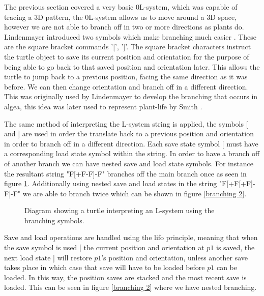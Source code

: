 \begin{flushleft}

The previous section covered a very basic 0L-system, which was capable of tracing a 3D pattern, the 0L-system allows us to move around a 3D space, however we are not able to branch off in two or more directions as plants do. Lindenmayer introduced two symbols which make branching much easier \cite{lindenmayer1968mathematical}. These are the square bracket commands '[', ']'. The square bracket characters instruct the turtle object to save its current position and orientation for the purpose of being able to go back to that saved position and orientation later. This allows the turtle to jump back to a previous position, facing the same direction as it was before. We can then change orientation and branch off in a different direction. This was originally used by Lindenmayer to develop the branching that occurs in algea, this idea was later used to represent plant-life by Smith \cite{smith1984plants}. \\

\vspace{5mm}

The same method of interpreting the L-system string is applied, the symbols [ and ] are used in order the translate back to a previous position and orientation in order to branch off in a different direction. Each save state symbol [ must have a corresponding load state symbol within the string. In order to have a branch off of another branch we can have nested save and load state symbols. For instance the resultant string "F[+F-F]-F" branches off the main branch once as seen in figure \ref{branching 1}. Additionally using nested save and load states in the string "F[+F[+F]-F]-F" we are able to branch twice which can be shown in figure \ref{branching 2}.

\begin{figure}[htbp]
	{\centering
		\setlength{\fboxrule}{1pt}
		\vspace{7px}
		\caption{Diagram showing a turtle interpreting an L-system using the branching symbols.} \label{branching 1}
	}
\end{figure}
\FloatBarrier

Save and load operations are handled using the \acrfull{lifo} principle, meaning that when the save symbol is used [ the current position and orientation at $p1$ is saved, the next load state ] will restore $p1$'s position and orientation, unless another save takes place in which case that save will have to be loaded before $p1$ can be loaded. In this way, the position saves are stacked and the most recent save is loaded. This can be seen in figure \ref{branching 2} where we have nested branching. \\


\end{flushleft}
